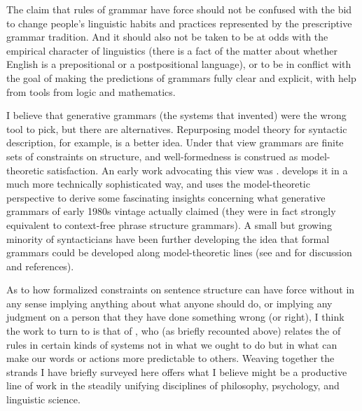 \documentclass[output=paper]{langscibook}
\begin{document}
The claim that rules of grammar have  force should not be confused with the bid to change people's linguistic habits and practices represented by the prescriptive grammar tradition. And it should also not be taken to be at odds with the empirical character of linguistics (there is a fact of the matter about whether English is a prepositional or a postpositional language), or to be in conflict with the goal of making the predictions of grammars fully clear and explicit, with help from tools from logic and mathematics.

I believe that generative grammars (the systems that {\Post} invented) were the wrong tool to pick, but there are alternatives.  Repurposing model theory for syntactic description, for example, is a better idea. Under that view grammars are finite sets of constraints on structure, and well-formedness is construed as model-theoretic satisfaction. An early work advocating this view was \citet{JohnPost80}. \citet{Rogers98} develops it in a much more technically sophisticated way, and uses the model-theoretic perspective to derive some fascinating insights concerning what generative grammars of early 1980s vintage actually claimed (they were in fact strongly equivalent to context-free phrase structure grammars). A small but growing minority of syntacticians have been further developing the idea that formal grammars could be developed along model-theoretic lines (see \citealt{PullScho01LACL} and \citealt{Pullum13} for discussion and references).

As to how formalized constraints on sentence structure can have  force without in any sense implying anything about what anyone should do, or implying any judgment on a person that they have done something wrong (or right), I think the work to turn to is that of \citet{Millar04}, who (as briefly recounted above) relates the  of rules in certain kinds of systems not in what we ought to do but in what can make our words or actions more predictable to others. Weaving together the strands I have briefly surveyed here offers what I believe might be a productive line of work in the steadily unifying disciplines of philosophy, psychology, and linguistic science.

\sloppy
\printbibliography[heading=subbibliography,notkeyword=this]
\end{document}
